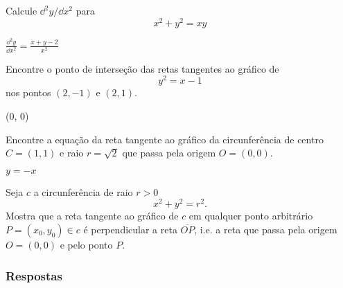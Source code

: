 \begin{exer}
  Calcule $\dd^2 y/\dd x^2$ para
  \begin{equation}
    x^2 + y^2 = xy
  \end{equation}
\end{exer}
\begin{resp}
  $\displaystyle \frac{\dd^2 y}{\dd x^2} = \frac{x + y - 2}{x^2}$
\end{resp}  

\begin{exer}
  Encontre o ponto de interseção das retas tangentes ao gráfico de
  \begin{equation}
    y^2  = x - 1
  \end{equation}
  nos pontos $(2, -1)$ e $(2, 1)$.
\end{exer}
\begin{resp}
  (0, 0)
\end{resp}

\begin{exer}
  Encontre a equação da reta tangente ao gráfico da circunferência de centro $C = (1,1)$ e raio $r=\sqrt{2}$ que passa pela origem $O = (0,0)$.  
\end{exer}
\begin{resp}
  $y = -x$
\end{resp}

\begin{exer}
  Seja $c$ a circunferência de raio $r> 0$
  \begin{equation}
    x^2 + y^2 = r^2.
  \end{equation}
  Mostra que a reta tangente ao gráfico de $c$ em qualquer ponto arbitrário $P = (x_0, y_0)\in c$ é perpendicular a reta $\overline{OP}$, i.e. a reta que passa pela origem $O = (0, 0)$ e pelo ponto $P.$
\end{exer}

\ifisbook
\subsubsection{Respostas}
\shipoutAnswer
\fi
